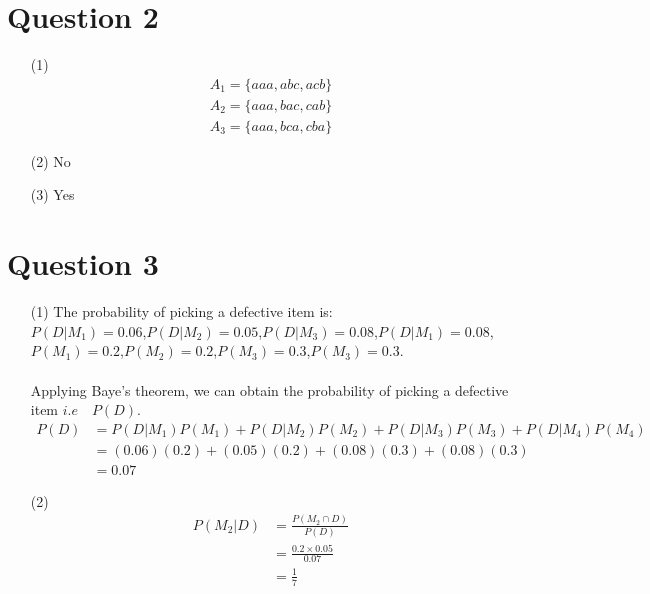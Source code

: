 \documentclass[12pt,a4paper]{article}
\begin{document}
\section*{Question 2}
\begin{itemize}

\item[(1)]
\begin{align*}
A_{1}=\{ aaa,abc,acb\}\\
A_{2}=\{ aaa, bac,cab\}\\
A_{3}=\{ aaa,bca,cba\}
\end{align*}

\item[(2)] No

\item[(3)] Yes

\end{itemize}
\section*{Question 3}
\begin{itemize}
\item[(1)] The probability of picking a defective item is:\\
$P\left(D|M_{1}\right)=0.06$,\quad $P\left(D|M_{2}\right)=0.05$,\quad$P\left(D|M_{3}\right)=0.08$,\quad$P\left(D|M_{1}\right)=0.08$,\quad $P(M_{1})=0.2$,\quad$P(M_{2})=0.2$,\quad$P(M_{3})=0.3$,\quad$P(M_{3})=0.3$.\\
\\
Applying Baye's theorem, we can obtain the probability of picking a defective item $i.e\quad P(D)$.\\
\begin{align*}
P(D)&=P\left(D|M_{1}\right)P\left(M_{1}\right)+P\left(D|M_{2}\right)P\left(M_{2}\right)+P\left(D|M_{3}\right)P\left(M_{3}\right)+P\left(D|M_{4}\right)P\left(M_{4}\right)\\
&=(0.06)(0.2)+(0.05)(0.2)+(0.08)(0.3)+(0.08)(0.3)\\
&=0.07
\end{align*}


\item[(2)]
\begin{align*}
P\left(M_{2}|D\right)&=\frac{P(M_{2}\cap D)}{P(D)}\\
&=\frac{0.2\times0.05}{0.07}\\
&=\frac{1}{7}
\end{align*}
\end{itemize}
\end{document}
